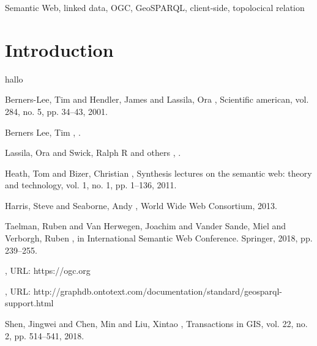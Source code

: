 \documentclass[twocolumn]{phdsymp} %
\begin{document}
\begin{keywords}
    Semantic Web, linked data, OGC, GeoSPARQL, client-side, topolocical relation
\end{keywords}

\section{Introduction}
hallo









%
\begin{thebibliography}{1}
    Berners-Lee, Tim and Hendler, James and Lassila, Ora
    ,
    \newblock Scientific american, vol. 284, no. 5, pp. 34–43, 2001.

    Berners Lee, Tim
    ,
    .

    Lassila, Ora and Swick, Ralph R and others
    ,
    .

    Heath, Tom and Bizer, Christian
    ,
    \newblock Synthesis lectures on the semantic web: theory and technology, vol. 1, no. 1, pp. 1–136, 2011.

    Harris, Steve and Seaborne, Andy
    ,
    \newblock World Wide Web Consortium, 2013.

    Taelman, Ruben and Van Herwegen, Joachim and Vander Sande, Miel and Verborgh, Ruben
    ,
    \newblock in International Semantic Web Conference. Springer, 2018, pp. 239–255.

    ,
    \newblock URL: https://ogc.org

    ,
    \newblock URL: http://graphdb.ontotext.com/documentation/standard/geosparql-support.html

    Shen, Jingwei and Chen, Min and Liu, Xintao
    ,
    \newblock Transactions in GIS, vol. 22, no. 2, pp. 514–541, 2018.
\end{thebibliography}
%
\end{document}
